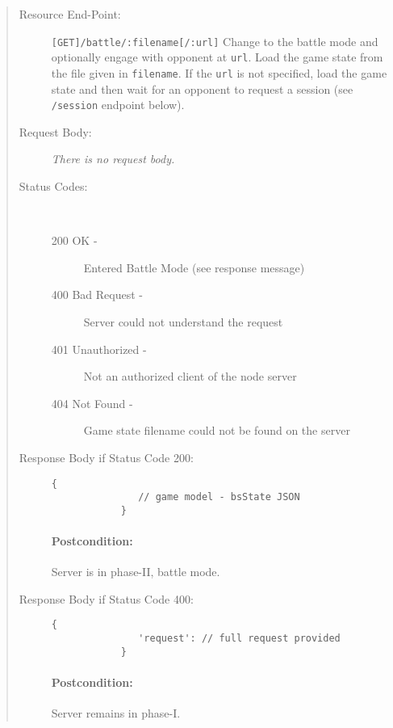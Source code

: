 \documentclass[10pt]{article}
\begin{document}
\begin{quote}
   \begin{description}
      \item[Resource End-Point:] \lstinline|[GET]/battle/:filename[/:url]| Change to the battle mode and optionally engage with opponent at \verb|url|. Load the game state from the file given in \verb|filename|. If the \verb|url| is not specified, load the game state and then wait for an opponent to request a session (see \verb|/session| endpoint below).
      
      \item[Request Body:] \emph{There is no request body.}
      
      \item[Status Codes:] ~
         \begin{description}
            \item[200 OK -] Entered Battle Mode (see response message)
            \item[400 Bad Request -] Server could not understand the request
            \item[401 Unauthorized -] Not an authorized client of the node server
            \item[404 Not Found -] Game state filename could not be found on the server  
         \end{description} 

      \item[Response Body if Status Code 200:]
         \begin{lstlisting}[gobble=12]
            {
               // game model - bsState JSON 
            }
         \end{lstlisting}

         \paragraph{Postcondition:} Server is in phase-II, battle mode.

      \item[Response Body if Status Code 400:]
         \begin{lstlisting}[gobble=12]
            {
               'request': // full request provided
            }
         \end{lstlisting}

         \paragraph{Postcondition:} Server remains in phase-I.


\end{description}
\end{quote}
\end{document}
